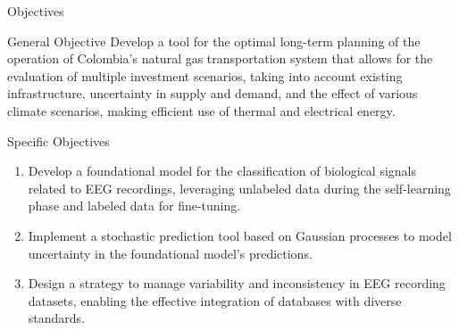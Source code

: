 \documentclass[aspectratio=169,12pt]{beamer}
\begin{document}
\frame{\titlepage}

\begin{frame}{Objectives}
	\begin{block}{General Objective}
		\small
		Develop a tool for the optimal long-term planning of the operation of Colombia's natural gas transportation system that allows for the evaluation of multiple investment scenarios, taking into account existing infrastructure, uncertainty in supply and demand, and the effect of various climate scenarios, making efficient use of thermal and electrical energy.
	\end{block}
	
	\vspace{-0.1cm}
	\begin{block}{Specific Objectives}
		\small
		\begin{enumerate}
			\item Develop a foundational model for the classification of biological signals related to EEG recordings, leveraging \textcolor{MyAccent}{unlabeled data} during the self-learning phase and labeled data for fine-tuning.
			\item Implement a \textcolor{MyAccent}{stochastic prediction} tool based on Gaussian processes to model uncertainty in the foundational model's predictions.
			\item Design a strategy to \textcolor{MyAccent}{manage variability and inconsistency} in EEG recording datasets, enabling the effective integration of databases with diverse standards.
		\end{enumerate}
	\end{block}
\end{frame}
	
\end{document}
